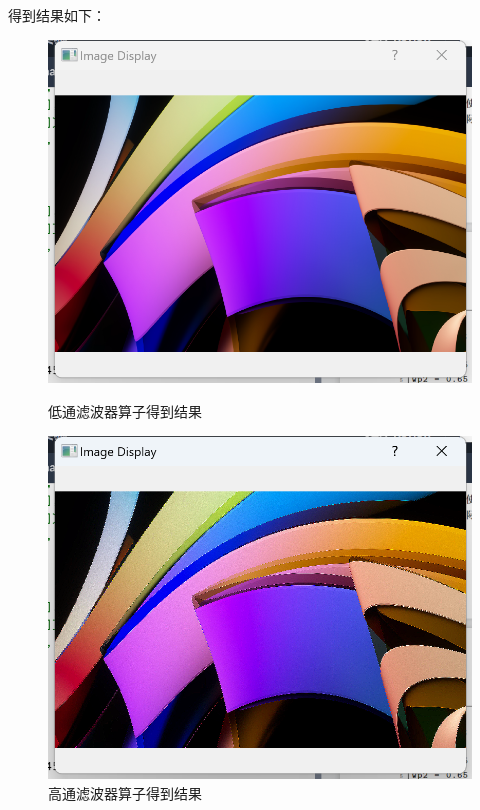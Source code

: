 \documentclass[a4paper,12pt]{article}
\begin{document}
得到结果如下：
\begin{figure}[h!]
    \centering
    \begin{minipage}[b]{0.48\textwidth}
        \centering
        \includegraphics[width=\linewidth]{images/Design/image_processing/1/lowpass.png}
        \caption{低通滤波器算子得到结果}
    \end{minipage}
    \hfill
    \begin{minipage}[b]{0.48\textwidth}
        \centering
        \includegraphics[width=\linewidth]{images/Design/image_processing/1/highpass.png}
        \caption{高通滤波器算子得到结果}
    \end{minipage}
    

\end{figure}
\end{document}
